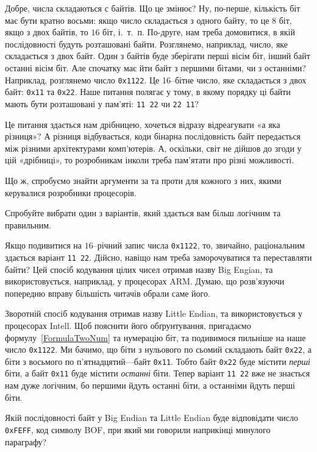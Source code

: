 \documentclass{book}
\newcommand{\bitstr}[1]{{\tt #1}}
\newcommand{\hexstr}[1]{{\tt 0x#1}}
\begin{document}
Добре, числа складаються с байтів.
Що це змінює?
Ну, по-перше, кількість біт має бути кратно восьми: якщо число складається з одного байту, то це $8$ біт, якщо з двох байтів, то $16$ біт, і.~т.~п.
По-друге, нам треба домовитися, в якій послідовності будуть розташовані байти.
Розглянемо, наприклад, число, яке складається з двох байт.
Один з байтів буде зберігати перші вісім біт, інший байт останні вісім біт.
Але спочатку має йти байт з першими бітами, чи з останніми?
Наприклад, розглянемо число \hexstr{1122}.
Це 16--бітне число, яке складається з двох байт: \hexstr{11} та \hexstr{22}.
Наше питання полягає у тому, в якому порядку ці байти мають бути розташовані у пам'яті: \bitstr{11~22} чи \bitstr{22~11}?

Це питання здається нам дрібницею, хочеться відразу відреагувати «а яка різниця»?
А різниця відбувається, коди бінарна послідовність байт передається між різними архітектурами комп'ютерів.
А, оскільки, світ не дійшов до згоди у цій «дрібниці», то розробникам інколи треба пам'ятати про різні можливості.

Що ж, спробуємо знайти аргументи за та проти для кожного з них, якими керувалися розробники процесорів.

\begin{exercise}
Спробуйте вибрати один з варіантів, який здається вам більш логічним та правильним.
\end{exercise}

Якщо подивитися на $16$--річний запис числа \hexstr{1122}, то, звичайно, раціональним здається варіант \bitstr{11~22}.
Дійсно, навіщо нам треба заморочуватися та переставляти байти?
Цей спосіб кодування цілих чисел отримав назву Big Engian, та використовується, наприклад, у процесорах ARM.
Думаю, що розв'язуючи попередню вправу більшість читачів обрали саме його.

Зворотній спосіб кодування отримав назву Little Endian, та використовується у процесорах Intell.
Щоб пояснити його обґрунтування, пригадаємо формулу~\ref{FormulaTwoNum} та нумерацію біт, та подивимося пильніше на наше число \hexstr{1122}.
Ми бачимо, що біти з нульового по сьомий складають байт \hexstr{22}, а біти з восьмого по п'ятнадцятий---байт \hexstr{11}.
Тобто байт \hexstr{22} буде містити \textit{перші} біти, а байт \hexstr{11} буде містити \textit{останні} біти.
Тепер варіант \bitstr{11~22} вже не знається нам дуже логічним, бо першими йдуть останні біти, а останніми йдуть перші біти.

\begin{exercise}
Якій послідовності байт у Big Endian та Little Endian буде відповідати число \hexstr{FEFF}, код символу BOF, при який ми говорили наприкінці минулого параграфу?
\end{exercise}
\end{document}
